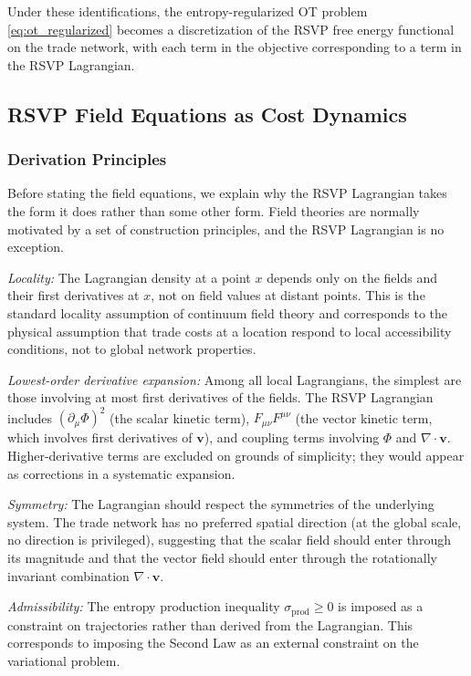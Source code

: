 \documentclass[12pt]{article}
\newcommand{\divv}{\nabla\!\cdot\!\mathbf{v}}
\newcommand{\sigprod}{\sigma_{\mathrm{prod}}}
\begin{document}
Under these identifications, the entropy-regularized OT problem \eqref{eq:ot_regularized} becomes a discretization of the RSVP free energy functional on the trade network, with each term in the objective corresponding to a term in the RSVP Lagrangian.

\subsection{RSVP Field Equations as Cost Dynamics}

\subsubsection{Derivation Principles}

Before stating the field equations, we explain why the RSVP Lagrangian takes the form it does rather than some other form. Field theories are normally motivated by a set of construction principles, and the RSVP Lagrangian is no exception.

\emph{Locality:} The Lagrangian density at a point $x$ depends only on the fields and their first derivatives at $x$, not on field values at distant points. This is the standard locality assumption of continuum field theory and corresponds to the physical assumption that trade costs at a location respond to local accessibility conditions, not to global network properties.

\emph{Lowest-order derivative expansion:} Among all local Lagrangians, the simplest are those involving at most first derivatives of the fields. The RSVP Lagrangian includes $(\partial_\mu\Phi)^2$ (the scalar kinetic term), $F_{\mu\nu}F^{\mu\nu}$ (the vector kinetic term, which involves first derivatives of $\mathbf{v}$), and coupling terms involving $\Phi$ and $\divv$. Higher-derivative terms are excluded on grounds of simplicity; they would appear as corrections in a systematic expansion.

\emph{Symmetry:} The Lagrangian should respect the symmetries of the underlying system. The trade network has no preferred spatial direction (at the global scale, no direction is privileged), suggesting that the scalar field should enter through its magnitude and that the vector field should enter through the rotationally invariant combination $\divv$.

\emph{Admissibility:} The entropy production inequality $\sigprod \geq 0$ is imposed as a constraint on trajectories rather than derived from the Lagrangian. This corresponds to imposing the Second Law as an external constraint on the variational problem.
\end{document}
